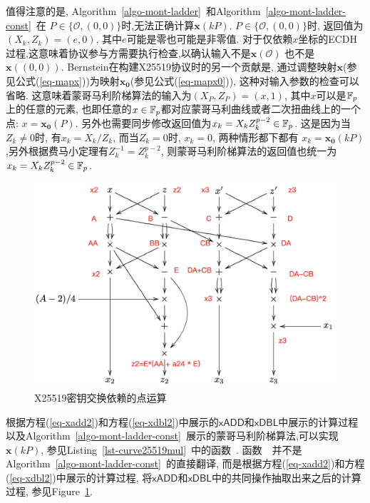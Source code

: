 值得注意的是, Algorithm~\ref{algo-mont-ladder}~和Algorithm~\ref{algo-mont-ladder-const}~在
$P\in\{\mathcal{O}, (0,0)\}$时,无法正确计算$\mathbf{x}(kP)$.
$P\in\{\mathcal{O}, (0,0)\}$时, 返回值为$(X_k, Z_k) = (e, 0)$, 其中$e$可能是零也可能是非零值.
对于仅依赖$x$坐标的ECDH过程,这意味着协议参与方需要执行检查,以确认输入不是$\mathbf{x}(\mathcal{O})$
也不是$\mathbf{x}((0,0))$. Bernstein在构建X25519协议时的另一个贡献是,
通过调整映射$\mathbf{x}$(参见公式(\ref{eq-mapx}))为映射$\mathbf{x_0}$(参见公式(\ref{eq-mapx0})), 
这种对输入参数的检查可以省略. 这意味着蒙哥马利阶梯算法的输入为$(X_P,Z_P)= (x, 1)$, 
其中$x$可以是$\mathbb{F}_p$上的任意的元素, 也即任意的$x\in \mathbb{F}_p$都对应蒙哥马利曲线或者二次扭曲线上的一个点:
$x  = \mathbf{x_0}(P)$. 另外也需要同步修改返回值为$x_k = X_kZ_k^{p-2} \in \mathbb{F}_p$.
这是因为当$Z_k\neq 0$时, 有$x_k = X_k/Z_k$, 而当$Z_k = 0$时, $x_k = 0$, 
两种情形都下都有 $x_k = \mathbf{x_0}(kP)$,另外根据费马小定理有$Z_k^{-1} = Z_k^{p-2}$, 
则蒙哥马利阶梯算法的返回值也统一为$x_k =  X_kZ_k^{p-2} \in \mathbb{F}_p$.

\begin{figure}[h]
\centering
\includegraphics[width=.8\textwidth]{x-coordiniate-add.png}
\caption{X25519密钥交换依赖的点运算}\label{fig-xadd}
\end{figure}

根据方程(\ref{eq-xadd2})和方程(\ref{eq-xdbl2})中展示的$\textsf{xADD}$和$\textsf{xDBL}$中展示的计算过程
以及Algorithm~\ref{algo-mont-ladder-const}~展示的蒙哥马利阶梯算法,可以实现$\mathbf{x}(kP)$, 
参见Listing~\ref{lst-curve25519mul}~中的函数~.
函数~~并不是Algorithm~\ref{algo-mont-ladder-const}~的直接翻译,
而是根据方程(\ref{eq-xadd2})和方程(\ref{eq-xdbl2})中展示的计算过程,
将$\textsf{xADD}$和$\textsf{xDBL}$中的共同操作抽取出来之后的计算过程, 参见Figure~\ref{fig-xadd}.

